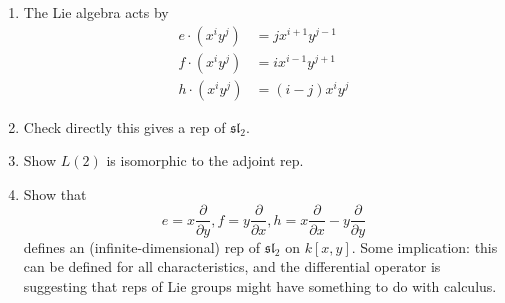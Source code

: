 \documentclass[a4paper]{article}
\newcommand*{\Lie}[1]{\mathfrak{#1}} %
\begin{document}
\begin{ex}\leavevmode
  \begin{enumerate}
  \item The Lie algebra acts by
    \begin{align*}
      e \cdot (x^iy^j) &= jx^{i + 1} y^{j - 1} \\
      f \cdot (x^iy^j) &= ix^{i - 1} y^{j + 1} \\
      h \cdot (x^iy^j) &= (i - j) x^iy^j
    \end{align*}
  \item Check directly this gives a rep of \(\Lie{sl}_2\).
  \item Show \(L(2)\) is isomorphic to the adjoint rep.
  \item Show that
    \[
      e = x \frac{\partial  }{\partial y}, f = y \frac{\partial  }{\partial x}, h = x \frac{\partial  }{\partial x} - y \frac{\partial  }{\partial y}
    \]
    defines an (infinite-dimensional) rep of \(\Lie{sl}_2\) on \(k[x, y]\). Some implication: this can be defined for all characteristics, and the differential operator is suggesting that reps of Lie groups might have something to do with calculus.
  \end{enumerate}
\end{ex}




\printindex
\end{document}
